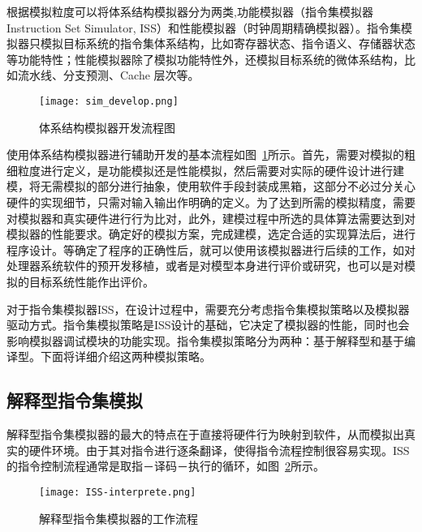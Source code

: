根据模拟粒度可以将体系结构模拟器分为两类,功能模拟器（指令集模拟器Instruction  Set  Simulator, ISS）和性能模拟器（时钟周期精确模拟器）。指令集模拟器只模拟目标系统的指令集体系结构，比如寄存器状态、指令语义、存储器状态等功能特性；性能模拟器除了模拟功能特性外，还模拟目标系统的微体系结构，比如流水线、分支预测、Cache 层次等\cite{cachecengcideng}。
\begin{figure}[h]
  \centering
  \texttt{[image: sim\_develop.png]}
  \caption{体系结构模拟器开发流程图}
  \label{fig:sim-dev-process}
\end{figure}



使用体系结构模拟器进行辅助开发的基本流程如图~\ref{fig:sim-dev-process}所示。首先，需要对模拟的粗细粒度进行定义，是功能模拟还是性能模拟，然后需要对实际的硬件设计进行建模，将无需模拟的部分进行抽象，使用软件手段封装成黑箱，这部分不必过分关心硬件的实现细节，只需对输入输出作明确的定义。为了达到所需的模拟精度，需要对模拟器和真实硬件进行行为比对，此外，建模过程中所选的具体算法需要达到对模拟器的性能要求。确定好的模拟方案，完成建模，选定合适的实现算法后，进行程序设计。等确定了程序的正确性后，就可以使用该模拟器进行后续的工作，如对处理器系统软件的预开发移植，或者是对模型本身进行评价或研究，也可以是对模拟的目标系统性能作出评价。


对于指令集模拟器ISS，在设计过程中，需要充分考虑指令集模拟策略以及模拟器驱动方式。指令集模拟策略是ISS设计的基础，它决定了模拟器的性能，同时也会影响模拟器调试模块的功能实现。指令集模拟策略分为两种：基于解释型和基于编译型。下面将详细介绍这两种模拟策略。



\subsection{解释型指令集模拟}
解释型指令集模拟器的最大的特点在于直接将硬件行为映射到软件\cite{jump}，从而模拟出真实的硬件环境。由于其对指令进行逐条翻译，使得指令流程控制很容易实现。ISS的指令控制流程通常是取指－译码－执行的循环，如图~\ref{fig:ISS-interprete}所示。
\begin{figure}[h]
  \centering
  \texttt{[image: ISS-interprete.png]}
  \caption{解释型指令集模拟器的工作流程}
  \label{fig:ISS-interprete}
\end{figure}


